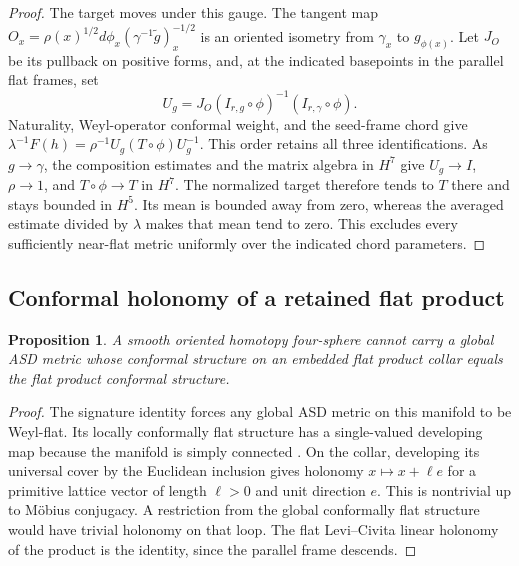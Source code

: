\documentclass[11pt]{article}
\numberwithin{equation}{section}
\newtheorem{proposition}[theorem]{Proposition}
\theoremstyle{definition}
\theoremstyle{remark}
\begin{document}
\begin{proof}
The target moves under this gauge. The tangent map
\(O_x=\rho(x)^{1/2}d\phi_x(\gamma^{-1}\widetilde g)^{-1/2}_x\)
is an oriented isometry from \(\gamma_x\) to \(g_{\phi(x)}\).
Let \(J_O\) be its pullback on positive forms, and, at the
indicated basepoints in the parallel flat frames, set
\[
 U_g=J_O(I_{r,g}\circ\phi)^{-1}(I_{r,\gamma}\circ\phi).
\]
Naturality, Weyl-operator conformal weight, and the seed-frame chord
give \(\lambda^{-1}F(h)=\rho^{-1}U_g(T\circ\phi)U_g^{-1}\).
This order retains all three identifications. As \(g\to\gamma\),
the composition estimates and the matrix algebra in \(H^7\) give
\(U_g\to I\), \(\rho\to1\), and \(T\circ\phi\to T\) in \(H^7\).
The normalized target therefore tends to \(T\) there and stays
bounded in \(H^5\). Its mean is bounded away from zero, whereas
the averaged estimate divided by \(\lambda\) makes that mean
tend to zero. This excludes every sufficiently near-flat metric
uniformly over the indicated chord parameters.
\end{proof}

\subsection{Conformal holonomy of a retained flat product}

\begin{proposition}\label{bdry:holonomy}
A smooth oriented homotopy four-sphere cannot carry a global ASD metric
whose conformal structure on an embedded flat product collar equals
the flat product conformal structure.
\end{proposition}
\begin{proof}
The signature identity forces any global ASD metric on this manifold
to be Weyl-flat. Its locally conformally flat structure has a
single-valued developing map because the manifold is simply connected
\cite[\S1]{SchoenYau1988Conformal}. On the collar, developing its
universal cover by the Euclidean inclusion gives holonomy
\(x\mapsto x+\ell e\) for a primitive lattice vector of length \(\ell>0\)
and unit direction \(e\). This is nontrivial up to Möbius conjugacy.
A restriction from the global conformally flat structure would have
trivial holonomy on that loop. The flat Levi--Civita linear holonomy
of the product is the identity, since the parallel frame descends.
\end{proof}
\end{document}
